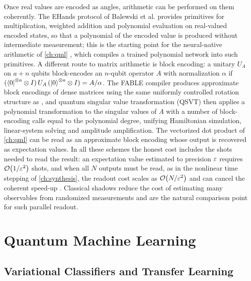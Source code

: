 Once real values are encoded as angles, arithmetic can be performed on them coherently. The EHands protocol of Balewski et al. \cite{balewski2025ehands} provides primitives for multiplication, weighted addition and polynomial evaluation on real-valued encoded states, so that a polynomial of the encoded value is produced without intermediate measurement; this is the starting point for the neural-native arithmetic of \cref{ch:qml} \cite{guo2026nnqa}, which compiles a trained polynomial network into such primitives. A different route to matrix arithmetic is block encoding: a unitary $U_A$ on $a+n$ qubits block-encodes an $n$-qubit operator $A$ with normalization $\alpha$ if $(\bra{0}^{\otimes a}\otimes I)\,U_A\,(\ket{0}^{\otimes a}\otimes I)=A/\alpha$. The FABLE compiler \cite{camps2022fable} produces approximate block encodings of dense matrices using the same uniformly controlled rotation structure as \qcrank{}, and quantum singular value transformation (QSVT) \cite{gilyen2019qsvt} then applies a polynomial transformation to the singular values of $A$ with a number of block-encoding calls equal to the polynomial degree, unifying Hamiltonian simulation, linear-system solving and amplitude amplification. The vectorized dot product of \cref{ch:qml} \cite{guo2025vqt} can be read as an approximate block encoding whose output is recovered as expectation values. In all these schemes the honest cost includes the shots needed to read the result: an expectation value estimated to precision $\varepsilon$ requires $\mathcal{O}\!\left(1/\varepsilon^2\right)$ shots, and when all $N$ outputs must be read, as in the nonlinear time stepping of \cref{ch:synthesis}, the readout cost scales as $\mathcal{O}\!\left(N/\varepsilon^2\right)$ and can cancel the coherent speed-up \cite{guo2026nonlinearwaves}. Classical shadows \cite{huang2020shadows} reduce the cost of estimating many observables from randomized measurements and are the natural comparison point for such parallel readout.

\section{Quantum Machine Learning}\label{sec:bg:qml}

\subsection{Variational Classifiers and Transfer Learning}

